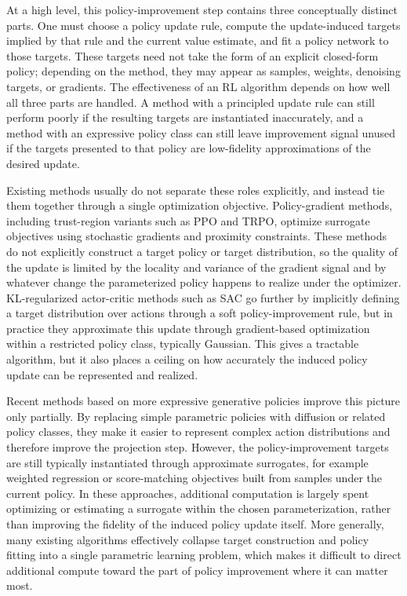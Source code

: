 \documentclass{article}
\theoremstyle{plain}
\theoremstyle{definition}
\theoremstyle{remark}
\begin{document}
At a high level, this policy-improvement step contains three conceptually distinct parts. One must choose a policy update rule, compute the update-induced targets implied by that rule and the current value estimate, and fit a policy network to those targets. These targets need not take the form of an explicit closed-form policy; depending on the method, they may appear as samples, weights, denoising targets, or gradients. The effectiveness of an RL algorithm depends on how well all three parts are handled. A method with a principled update rule can still perform poorly if the resulting targets are instantiated inaccurately, and a method with an expressive policy class can still leave improvement signal unused if the targets presented to that policy are low-fidelity approximations of the desired update.

Existing methods usually do not separate these roles explicitly, and instead tie them together through a single optimization objective. Policy-gradient methods, including trust-region variants such as PPO and TRPO, optimize surrogate objectives using stochastic gradients and proximity constraints. These methods do not explicitly construct a target policy or target distribution, so the quality of the update is limited by the locality and variance of the gradient signal and by whatever change the parameterized policy happens to realize under the optimizer. KL-regularized actor-critic methods such as SAC go further by implicitly defining a target distribution over actions through a soft policy-improvement rule, but in practice they approximate this update through gradient-based optimization within a restricted policy class, typically Gaussian. This gives a tractable algorithm, but it also places a ceiling on how accurately the induced policy update can be represented and realized.

Recent methods based on more expressive generative policies improve this picture only partially. By replacing simple parametric policies with diffusion or related policy classes, they make it easier to represent complex action distributions and therefore improve the projection step. However, the policy-improvement targets are still typically instantiated through approximate surrogates, for example weighted regression or score-matching objectives built from samples under the current policy. In these approaches, additional computation is largely spent optimizing or estimating a surrogate within the chosen parameterization, rather than improving the fidelity of the induced policy update itself. More generally, many existing algorithms effectively collapse target construction and policy fitting into a single parametric learning problem, which makes it difficult to direct additional compute toward the part of policy improvement where it can matter most.
\end{document}
